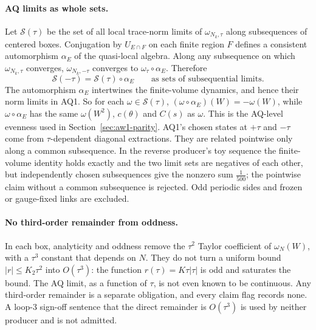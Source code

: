 \paragraph{AQ limits as whole sets.}
Let $\mathcal S(\tau)$ be the set of all local trace-norm limits of
$\omega_{N_k,\tau}$ along subsequences of centered boxes. Conjugation by
$U_{E\cap F}$ on each finite region $F$ defines a consistent automorphism
$\alpha_E$ of the quasi-local algebra. Along any subsequence on which
$\omega_{N_k,\tau}$ converges, $\omega_{N_k,-\tau}$ converges to
$\omega_\tau\circ\alpha_E$. Therefore
\begin{equation}
 \mathcal S(-\tau)=\mathcal S(\tau)\circ\alpha_E\qquad\text{as sets of subsequential limits.}
 \label{eq:aw1-aq-sets}
\end{equation}
The automorphism $\alpha_E$ intertwines the finite-volume dynamics, and hence
their norm limits in AQ1. So for each $\omega\in\mathcal S(\tau)$,
$(\omega\circ\alpha_E)(W)=-\omega(W)$, while $\omega\circ\alpha_E$ has the same
$\omega(W^2)$, $c(\theta)$ and $C(s)$ as $\omega$. This is the AQ-level
evenness used in Section~\ref{sec:aw1-parity}. AQ1's chosen states at $+\tau$
and $-\tau$ come from $\tau$-dependent diagonal extractions. They are related
pointwise only along a common subsequence. In the reverse producer's toy
sequence the finite-volume identity holds exactly and the two limit sets are
negatives of each other, but independently chosen subsequences give the
nonzero sum $\tfrac1{500}$; the pointwise claim without a common subsequence
is rejected. Odd periodic sides and frozen or gauge-fixed links are excluded.

\paragraph{No third-order remainder from oddness.}
In each box, analyticity and oddness remove the $\tau^2$ Taylor coefficient
of $\omega_N(W)$, with a $\tau^3$ constant that depends on $N$. They do not
turn a uniform bound $|r|\le K_2\tau^2$ into $O(\tau^3)$: the function
$r(\tau)=K\tau|\tau|$ is odd and saturates the bound. The AQ limit, as a
function of $\tau$, is not even known to be continuous. Any third-order
remainder is a separate obligation, and every claim flag records none. A
loop-3 sign-off sentence that the direct remainder is $O(\tau^3)$ is used by
neither producer and is not admitted.

